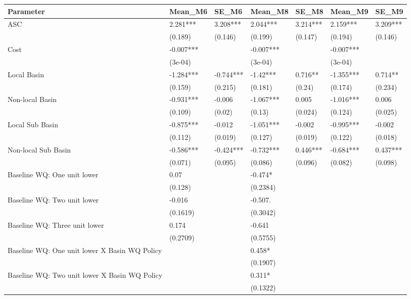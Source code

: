 \begin{table}[ht]
\centering
\begin{tabular}{lllllll}
  \hline
Parameter & Mean\_M6 & SE\_M6 & Mean\_M8 & SE\_M8 & Mean\_M9 & SE\_M9 \\ 
  \hline
ASC & 2.281*** & 3.208*** & 2.044*** & 3.214*** & 2.159*** & 3.209*** \\ 
   & (0.189) & (0.146) & (0.199) & (0.147) & (0.194) & (0.146) \\ 
  Cost & -0.007*** &  & -0.007*** &  & -0.007*** &  \\ 
   & (3e-04) &  & (3e-04) &  & (3e-04) &  \\ 
  Local Basin & -1.284*** & -0.744*** & -1.42*** & 0.716** & -1.355*** & 0.714** \\ 
   & (0.159) & (0.215) & (0.181) & (0.24) & (0.174) & (0.234) \\ 
  Non-local Basin & -0.931*** & -0.006 & -1.067*** & 0.005 & -1.016*** & 0.006 \\ 
   & (0.109) & (0.02) & (0.13) & (0.024) & (0.124) & (0.025) \\ 
  Local Sub Basin & -0.875*** & -0.012 & -1.051*** & -0.002 & -0.995*** & -0.002 \\ 
   & (0.112) & (0.019) & (0.127) & (0.019) & (0.122) & (0.018) \\ 
  Non-local Sub Basin & -0.586*** & -0.424*** & -0.732*** & 0.446*** & -0.684*** & 0.437*** \\ 
   & (0.071) & (0.095) & (0.086) & (0.096) & (0.082) & (0.098) \\ 
  Baseline WQ: One unit lower & 0.07 &  & -0.474* &  &  &  \\ 
   & (0.128) &  & (0.2384) &  &  &  \\ 
  Baseline WQ: Two unit lower & -0.016 &  & -0.507. &  &  &  \\ 
   & (0.1619) &  & (0.3042) &  &  &  \\ 
  Baseline WQ: Three unit lower & 0.174 &  & -0.641 &  &  &  \\ 
   & (0.2709) &  & (0.5755) &  &  &  \\ 
  Baseline WQ: One unit lower X Basin WQ Policy &  &  & 0.458* &  &  &  \\ 
   &  &  & (0.1907) &  &  &  \\ 
  Baseline WQ: Two unit lower X Basin WQ Policy &  &  & 0.311* &  &  &  \\ 
   &  &  & (0.1322) &  &  &  \\ 

\end{tabular}
\end{table}
